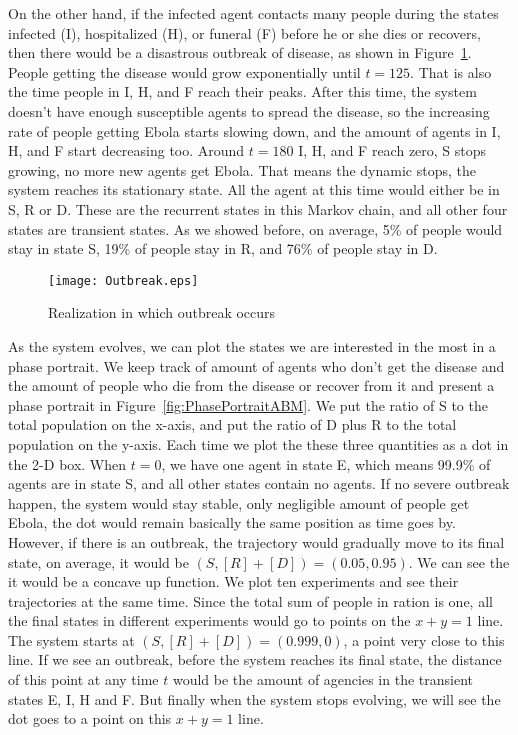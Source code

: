 On the other hand, if the infected agent contacts many people during the states infected (I), hospitalized (H), or funeral (F) before he or she dies or recovers, then there would be a disastrous outbreak of disease, as shown in Figure~\ref{fig:Outbreak}. People getting the disease would grow exponentially until $t = 125$. That is also the time people in I, H, and F reach their peaks. After this time, the system doesn't have enough susceptible agents to spread the disease, so the increasing rate of people getting Ebola starts slowing down, and the amount of agents in I, H, and F start decreasing too. Around $t = 180$ I, H, and F reach zero, S stops growing, no more new agents get Ebola. That means the dynamic stops, the system reaches its stationary state. All the agent at this time would either be in S, R or D. These are the recurrent states in this Markov chain, and all other four states are transient states. As we showed before, on average, 5\% of people would stay in state S, 19\% of people stay in R, and 76\% of people stay in D. 
\begin{figure}
\begin{center}
\texttt{[image: Outbreak.eps]}
\end{center}
\caption{Realization in which outbreak occurs}
\label{fig:Outbreak}
\end{figure}




As the system evolves, we can plot the states we are interested in the most in a phase portrait. We keep track of amount of agents who don't get the disease and the amount of people who die from the disease or recover from it and present a phase portrait in Figure~\ref{fig:PhasePortraitABM}. We put the ratio of S to the total population on the x-axis, and put the ratio of D plus R to the total population on the y-axis. Each time we plot the these three quantities as a dot in the 2-D box. When $t = 0$, we have one agent in state E, which means 99.9\% of agents are in state S, and all other states contain no agents. If no severe outbreak happen, the system would stay stable, only negligible amount of people get Ebola, the dot would remain basically the same position as time goes by. However, if there is an outbreak, the trajectory would gradually move to its final state, on average, it would be $(S, [R]+[D]) = (0.05, 0.95)$. We can see the it would be a concave up function. We plot ten experiments and see their trajectories at the same time. Since the total sum of people in ration is one, all the final states in different experiments would go to points on the $x + y = 1$ line. The system starts at $(S, [R]+[D]) = (0.999, 0)$, a point very close to this line. If we see an outbreak, before the system reaches its final state, the distance of this point at any time $t$ would be the amount of agencies in the transient states E, I, H and F. But finally when the system stops evolving, we will see the dot goes to a point on this  $x + y = 1$ line. 

